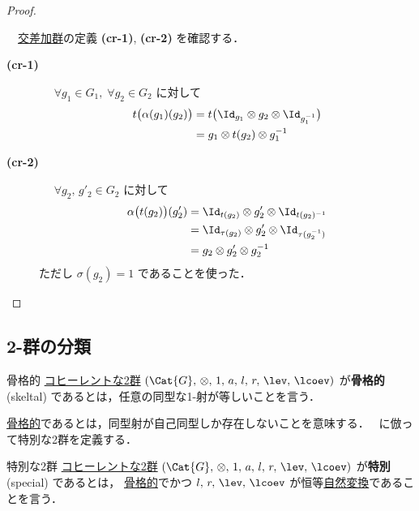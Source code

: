 \documentclass[TQFT_main]{subfiles}
\begin{document}
\begin{proof}
\begin{enumerate}
        　\hyperref[def:crossed-module]{交差加群}の定義 \textsf{\textbf{(cr-1)}}, \textsf{\textbf{(cr-2)}} を確認する．
        \begin{description}
            \item[\textbf{(cr-1)}]　
            $\forall g_1 \in G_1,\; \forall g_2 \in G_2$ に対して
            \begin{align}
                t \bigl( \alpha(g_1)(g_2) \bigr) 
                &= t \bigl( \Id_{g_1} \otimes g_2 \otimes \Id_{g_1^{-1}} \bigr) \\
                &= g_1 \otimes t(g_2) \otimes g_1^{-1}
            \end{align}
            
            \item[\textbf{(cr-2)}]　
            $\forall g_2,\, g'_2 \in G_2$ に対して
            \begin{align}
                \alpha \bigl( t(g_2) \bigr) (g'_2)
                &= \Id_{t(g_2)} \otimes g'_2 \otimes \Id_{t(g_2)^{-1}} \\
                &= \Id_{\tau(g_2)} \otimes g'_2 \otimes \Id_{\tau(g_2^{-1})} \\
                &= g_2 \otimes g'_2 \otimes g_2^{-1}
            \end{align}
            ただし $\sigma (g_2) = 1$ であることを使った．
        \end{description}
        
    \end{enumerate}
    
\end{proof}

\subsection{2-群の分類}

\begin{mydef}[label=def:skeltal2G]{骨格的}
    \hyperref[def:W2G-C2G]{コヒーレントな2群} $(\Cat{G},\, \otimes,\, 1,\, a,\, l,\, r,\, \lev,\, \lcoev)$ が\textbf{骨格的} (skeltal) であるとは，任意の同型な1-射が等しいことを言う．
\end{mydef}

\hyperref[def:skeltal2G]{骨格的}であるとは，同型射が自己同型しか存在しないことを意味する．
~\cite[p.55]{baez2004higherdimensionalalgebrav2groups}に倣って特別な2群を定義する．

\begin{mydef}[label=def:special2G]{特別な2群}
    \hyperref[def:W2G-C2G]{コヒーレントな2群} $(\Cat{G},\, \otimes,\, 1,\, a,\, l,\, r,\, \lev,\, \lcoev)$ が\textbf{特別} (special) であるとは，
    \hyperref[def:skeltal2G]{骨格的}でかつ $l,\, r,\, \lev,\, \lcoev$ が恒等\hyperref[def:nat]{自然変換}であることを言う．
\end{mydef}
\end{document}
